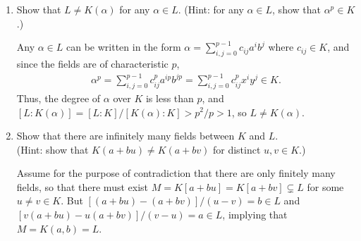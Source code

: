 \documentclass[12pt]{article}
\begin{document}
\begin{enumerate}
\begin{enumerate}
        \item Show that $L \neq K(\alpha)$ for any $\alpha \in L$. (Hint: for any $\alpha \in L$, show that $\alpha^p \in K$.) \par
            \iffalse
                The elements of $L$ are of the form $c_0 + c_1 x + c_2 y + c_3\sqrt[p]{x} + c_4\sqrt[p]{y}$ where the $c_i \in \mathbb{Z}_p$. Since $L$ is (like $K$) of characteristic $p$,
                \begin{align*}
                    (c_0 + c_1 x + c_2 y + c_3 \sqrt[p]{x} + c_4 \sqrt[p]{y})^p = c_0^p + (c_1 x)^p + (c_2 y)^p + c_3^p x + c_4^p y \in K.
                \end{align*}
                This means that for any $\alpha \in L$, the degree of the minimum polynomial of $\alpha$ over $K$ is at most $p$, so $[L : K(\alpha)] = [L : K] / [K(\alpha) : K] \geq p^2 / p > 1$ implying $L \neq K(\alpha)$.
            \fi
            Any $\alpha \in L$ can be written in the form $\alpha = \sum_{i, j = 0}^{p - 1} c_{ij} a^i b^j$ where $c_{ij} \in K$, and since the fields are of characteristic $p$,
            \begin{align*}
                \alpha^p = \sum_{i, j = 0}^{p - 1} c_{ij}^p a^{ip} b^{jp} = \sum_{i, j = 0}^{p - 1} c_{ij}^p x^i y^j \in K.
            \end{align*}
            Thus, the degree of $\alpha$ over $K$ is less than $p$, and $[L : K(\alpha)] = [L : K] / [K(\alpha) : K] > p^2 / p > 1$, so $L \neq K(\alpha)$.

        \item Show that there are infinitely many fields between $K$ and $L$.  \\(Hint: show that $K(a+b u) \neq K(a+b v)$ for distinct $u,v \in K$.) \par
            Assume for the purpose of contradiction that there are only finitely many fields, so that there must exist $M = K[a + bu] = K[a + bv] \subsetneq L$ for some $u \neq v \in K$. But $[(a + bu) - (a + bv)] / (u - v) = b \in L$ and $[v(a + bu) - u(a + bv)] / (v - u) = a \in L$, implying that $M = K(a, b) = L$.
    \end{enumerate}


\end{enumerate}
\end{document}
